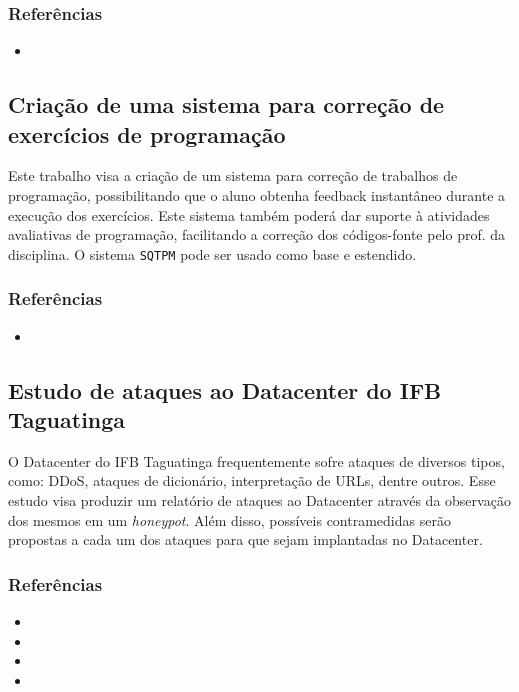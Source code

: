 \documentclass{article}
\newcommand*{\nsubsection}[1]{
    \subsection*{#1}
}
\begin{document}
\subsubsection*{Referências}


\begin{itemize}
	\item {}
\end{itemize}


\nsubsection{Criação de uma sistema para correção de exercícios de programação}

Este trabalho visa a criação de um sistema para correção de trabalhos de programação, possibilitando que o aluno obtenha feedback instantâneo durante a execução dos exercícios. Este sistema também poderá dar suporte à atividades avaliativas de programação, facilitando a correção dos códigos-fonte pelo prof. da disciplina. O sistema {\tt SQTPM} pode ser usado como base e estendido.

\subsubsection*{Referências}


\begin{itemize}
	\item {}
\end{itemize}




\nsubsection{Estudo de ataques ao Datacenter do IFB Taguatinga}

O Datacenter do IFB Taguatinga frequentemente sofre ataques de diversos tipos, como: DDoS, ataques de dicionário, interpretação de URLs, dentre outros.
Esse estudo visa produzir um relatório de ataques ao Datacenter através da observação dos mesmos em um \textit{honeypot}. Além disso, possíveis contramedidas serão propostas a cada um dos ataques para que sejam implantadas no Datacenter.

\subsubsection*{Referências}

\begin{itemize}
	\item {}
	\item {}
	\item {}
	\item {}
\end{itemize}
\end{document}
